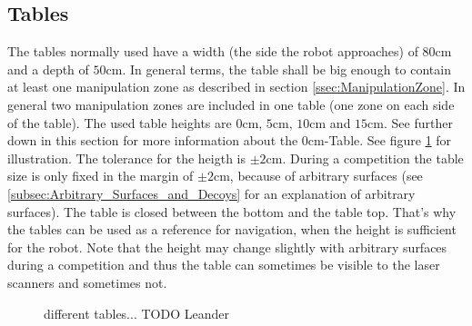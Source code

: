 \subsection{Tables}
\label{subsec: Tables}




The tables normally used have a width (the side the robot approaches) of $80\si{\centi\meter}$ and a depth of $50\si{\centi\meter}$. In general terms, the table shall be big enough to contain at least one manipulation zone as described in section \ref{ssec:ManipulationZone}. In general two manipulation zones are included in one table (one zone on each side of the table). The used table heights are $0\si{\centi\meter}$, $5\si{\centi\meter}$, $10\si{\centi\meter}$ and $15\si{\centi\meter}$. See further down in this section for more information about the $0\si{\centi\meter}$-Table. See figure \ref{fig:ws} for illustration. 
The tolerance for the heigth is $\pm 2 \si{\centi\meter}$. During a competition the table size is only fixed in the margin of $\pm 2 \si{\centi\meter}$, because of arbitrary surfaces (see \ref{subsec:Arbitrary_Surfaces_and_Decoys} for an explanation of arbitrary surfaces). 
The table is closed between the bottom and the table top. That's why the tables can be used as a reference for navigation, when the height is sufficient for the robot. Note that the height may change slightly with arbitrary surfaces during a competition and thus the table can sometimes be visible to the laser scanners and sometimes not. 
 
\begin{figure} [h!]
	\begin{center}
		\missingfigure[figwidth=6cm]{}	
	\end{center}
	\caption{different tables... TODO Leander}
	\label{fig:ws}
\end{figure}

